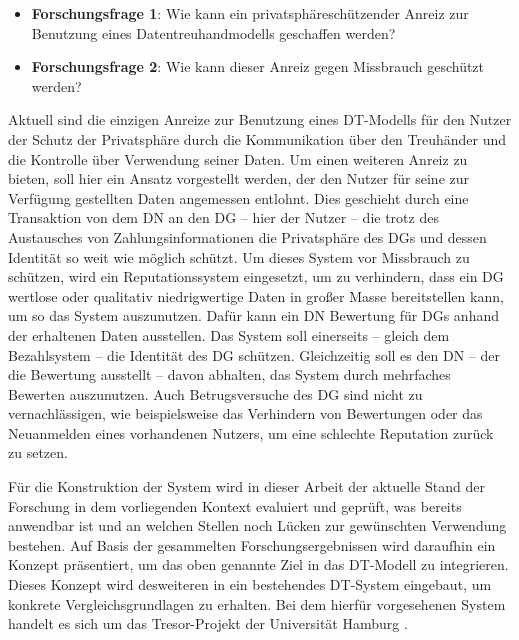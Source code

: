 \documentclass[
	fontsize=11pt,
	headings=small,
	parskip=half,           %
	bibliography=totoc,
	numbers=noenddot,       %
	open=any,               %
]{scrreprt}
\begin{document}
\begin{itemize}
    \item \textbf{Forschungsfrage 1}: Wie kann ein privatsphäreschützender Anreiz zur Benutzung eines Datentreuhandmodells geschaffen werden? 
    \item \textbf{Forschungsfrage 2}: Wie kann dieser Anreiz gegen Missbrauch geschützt werden? 
\end{itemize}

Aktuell sind die einzigen Anreize zur Benutzung eines DT-Modells für den Nutzer der Schutz der Privatsphäre durch die Kommunikation über den Treuhänder und die Kontrolle über Verwendung seiner Daten. Um einen weiteren Anreiz zu bieten, soll hier ein Ansatz vorgestellt werden, der den Nutzer für seine zur Verfügung gestellten Daten angemessen entlohnt. Dies geschieht durch eine Transaktion von dem DN an den DG -- hier der Nutzer -- die trotz des Austausches von Zahlungsinformationen die Privatsphäre des DGs und dessen Identität so weit wie möglich schützt. Um dieses System vor Missbrauch zu schützen, wird ein Reputationssystem eingesetzt, um zu verhindern, dass ein DG wertlose oder qualitativ niedrigwertige Daten in großer Masse bereitstellen kann, um so das System auszunutzen. Dafür kann ein DN Bewertung für DGs anhand der erhaltenen Daten ausstellen. Das System soll einerseits -- gleich dem Bezahlsystem -- die Identität des DG schützen. Gleichzeitig soll es den DN -- der die Bewertung ausstellt -- davon abhalten, das System durch mehrfaches Bewerten auszunutzen. Auch Betrugsversuche des DG sind nicht zu vernachlässigen, wie beispielsweise das Verhindern von Bewertungen oder das Neuanmelden eines vorhandenen Nutzers, um eine schlechte Reputation zurück zu setzen.

Für die Konstruktion der System wird in dieser Arbeit der aktuelle Stand der Forschung in dem vorliegenden Kontext evaluiert und geprüft, was bereits anwendbar ist und an welchen Stellen noch Lücken zur gewünschten Verwendung bestehen. Auf Basis der gesammelten Forschungsergebnissen wird daraufhin ein Konzept präsentiert, um das oben genannte Ziel in das DT-Modell zu integrieren. Dieses Konzept wird desweiteren in ein bestehendes DT-System eingebaut, um konkrete Vergleichsgrundlagen zu erhalten. Bei dem hierfür vorgesehenen System handelt es sich um das Tresor-Projekt der Universität Hamburg \cite{TRESOR}.


\end{document}
